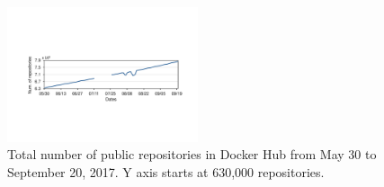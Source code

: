 \begin{figure}
	\centering
	\includegraphics[width=0.5\textwidth]{graphs/image_growth.pdf}
	\caption{Total number of public repositories in Docker Hub
		from May 30 to September 20, 2017. Y axis starts
		at 630,000 repositories.
	}
	\label{fig_image_growth}
\end{figure}
